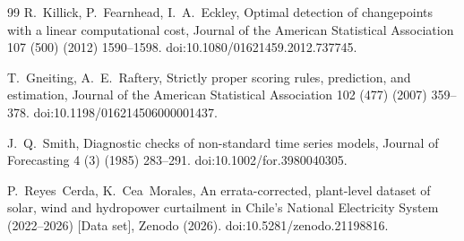 \documentclass[preprint,3p,times]{elsarticle}
\begin{document}
\begin{thebibliography}{99}
R.~Killick, P.~Fearnhead, I.~A.~Eckley,
Optimal detection of changepoints with a linear computational cost,
Journal of the American Statistical Association 107 (500) (2012) 1590--1598.
doi:10.1080/01621459.2012.737745.

T.~Gneiting, A.~E.~Raftery,
Strictly proper scoring rules, prediction, and estimation,
Journal of the American Statistical Association 102 (477) (2007) 359--378.
doi:10.1198/016214506000001437.

J.~Q.~Smith,
Diagnostic checks of non-standard time series models,
Journal of Forecasting 4 (3) (1985) 283--291.
doi:10.1002/for.3980040305.

P.~Reyes~Cerda, K.~Cea~Morales,
An errata-corrected, plant-level dataset of solar, wind and hydropower curtailment in Chile's National Electricity System (2022--2026) [Data set],
Zenodo (2026). doi:10.5281/zenodo.21198816.

\end{thebibliography}
\end{document}
